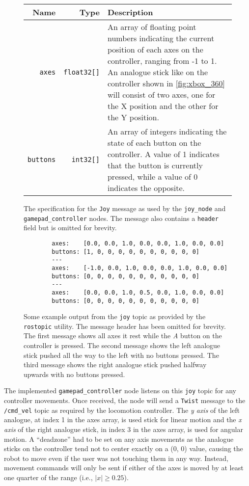 \begin{figure}[!h]
	\centering
	\begin{tabular}{ r r p{10cm} }
		\textbf{Name} & \textbf{Type} & \textbf{Description} \\
		\hline

		\texttt{axes} & 
		\texttt{float32[]} &
		An array of floating point numbers indicating the current position of each axes on the controller, ranging from -1 to 1. An analogue stick like on the controller shown in \autoref{fig:xbox_360} will consist of two axes, one for the X position and the other for the Y position. \\
		
		\texttt{buttons} & 
		\texttt{int32[]} & 
		An array of integers indicating the state of each button on the controller. A value of 1 indicates that the button is currently pressed, while a value of 0 indicates the opposite. \\
	\end{tabular}
	\caption{The specification for the \texttt{Joy} message as used by the \texttt{joy\_node} and \texttt{gamepad\_controller} nodes. The message also contains a \texttt{header} field but is omitted for brevity.}
	\label{fig:joy_msg}
\end{figure}

\begin{figure}[!h]
	\centering
	\begin{lstlisting}
		axes:    [0.0, 0.0, 1.0, 0.0, 0.0, 1.0, 0.0, 0.0]
		buttons: [1, 0, 0, 0, 0, 0, 0, 0, 0, 0, 0]
		---
		axes:    [-1.0, 0.0, 1.0, 0.0, 0.0, 1.0, 0.0, 0.0]
		buttons: [0, 0, 0, 0, 0, 0, 0, 0, 0, 0, 0]
		---
		axes:    [0.0, 0.0, 1.0, 0.5, 0.0, 1.0, 0.0, 0.0]
		buttons: [0, 0, 0, 0, 0, 0, 0, 0, 0, 0, 0]
	\end{lstlisting}
	\caption{Some example output from the \texttt{joy} topic as provided by the \texttt{rostopic} utility. The message header has been omitted for brevity. The first message shows all axes it rest while the \emph{A} button on the controller is pressed. The second message shows the left analogue stick pushed all the way to the left with no buttons pressed. The third message shows the right analogue stick pushed halfway upwards with no buttons pressed.}
	\label{fig:joy_example}
\end{figure}

The implemented \texttt{gamepad\_controller} node listens on this \texttt{joy} topic for any controller movements. Once received, the node will send a \texttt{Twist} message to the \texttt{/cmd\_vel} topic as required by the locomotion controller. The \emph{y axis} of the left analogue, at index 1 in the axes array, is used stick for linear motion and the \emph{x axis} of the right analogue stick, in index 3 in the axes array, is used for angular motion. A ``deadzone'' had to be set on any axis movements as the analogue sticks on the controller tend not to center exactly on a (0, 0) value, causing the robot to move even if the user was not touching them in any way. Instead, movement commands will only be sent if either of the axes is moved by at least one quarter of the range (i.e., $|x| \geq 0.25$).

